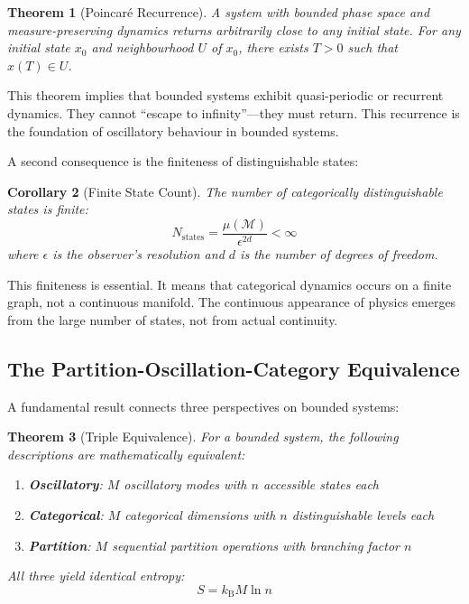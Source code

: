 \documentclass[twocolumn,10pt,aps,prd,superscriptaddress,nofootinbib]{revtex4-2}
\newtheorem{theorem}{Theorem}[section]
\newtheorem{corollary}[theorem]{Corollary}
\theoremstyle{remark}
\newcommand{\kB}{k_{\mathrm{B}}}
\newcommand{\Mspace}{\mathcal{M}}
\begin{document}
\begin{theorem}[Poincar\'{e} Recurrence]
\label{thm:poincare}
A system with bounded phase space and measure-preserving dynamics returns arbitrarily close to any initial state. For any initial state $x_0$ and neighbourhood $U$ of $x_0$, there exists $T > 0$ such that $x(T) \in U$.
\end{theorem}

This theorem implies that bounded systems exhibit quasi-periodic or recurrent dynamics. They cannot ``escape to infinity''---they must return. This recurrence is the foundation of oscillatory behaviour in bounded systems.

A second consequence is the finiteness of distinguishable states:

\begin{corollary}[Finite State Count]
\label{cor:finite_states}
The number of categorically distinguishable states is finite:
\begin{equation}
N_{\text{states}} = \frac{\mu(\Mspace)}{\epsilon^{2d}} < \infty
\label{eq:finite_states}
\end{equation}
where $\epsilon$ is the observer's resolution and $d$ is the number of degrees of freedom.
\end{corollary}

This finiteness is essential. It means that categorical dynamics occurs on a finite graph, not a continuous manifold. The continuous appearance of physics emerges from the large number of states, not from actual continuity.

\subsection{The Partition-Oscillation-Category Equivalence}

A fundamental result connects three perspectives on bounded systems:

\begin{theorem}[Triple Equivalence]
\label{thm:triple_equivalence}
For a bounded system, the following descriptions are mathematically equivalent:
\begin{enumerate}
\item \textbf{Oscillatory}: $M$ oscillatory modes with $n$ accessible states each
\item \textbf{Categorical}: $M$ categorical dimensions with $n$ distinguishable levels each
\item \textbf{Partition}: $M$ sequential partition operations with branching factor $n$
\end{enumerate}
All three yield identical entropy:
\begin{equation}
S = \kB M \ln n
\label{eq:entropy_identity}
\end{equation}
\end{theorem}
\end{document}
